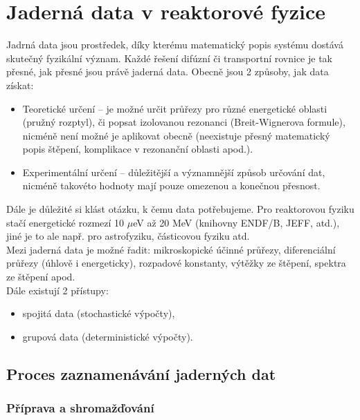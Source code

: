 \section{Jaderná data v reaktorové fyzice}

Jadrná data jsou prostředek, díky kterému matematický popis systému dostává skutečný fyzikální význam. Každé řešení difúzní či transportní rovnice je tak přesné, jak přesné jsou právě jaderná data. Obecně jsou 2 způsoby, jak data získat:

\begin{itemize}
  \item Teoretické určení -- je možné určit průřezy pro různé energetické oblasti (pružný rozptyl), či popsat izolovanou rezonanci (Breit-Wignerova formule), nicméně není možné je aplikovat obecně (neexistuje přesný matematický popis štěpení, komplikace v rezonanční oblasti apod.).
  \item Experimentální určení -- důležitější a významnější způsob určování dat, nicméně takovéto hodnoty mají pouze omezenou a konečnou přesnost.
\end{itemize}

Dále je důležité si klást otázku, k čemu data potřebujeme. Pro reaktorovou fyziku stačí energetické rozmezí 10 $\mu$eV až 20 MeV (knihovny ENDF/B, JEFF, atd.), jiné je to ale např. pro astrofyziku, částicovou fyziku atd.\\

Mezi jaderná data je možné řadit: mikroskopické účinné průřezy, diferenciální průřezy (úhlově i energeticky), rozpadové konstanty, výtěžky ze štěpení, spektra ze štěpení apod.\\

Dále existují 2 přístupy:

\begin{itemize}
  \item spojitá data (stochastické výpočty),
  \item grupová data (deterministické výpočty).
\end{itemize}

\subsection{Proces zaznamenávání jaderných dat}

\subsubsection{Příprava a shromažďování}

